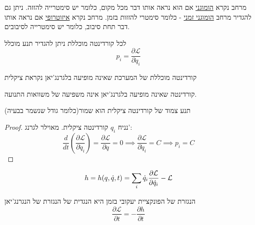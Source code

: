 \documentclass{tstextbook}
\begin{document}
\begin{definition}
מרחב נקרא \underline{הומוגני} אם הוא נראה אותו דבר מכל מקום, כלומר יש סימטרייה להזזה. ניתן גם להגדיר מרחב \underline{הומוגני זמני} - כלומר סימטרי להזזות בזמן.
מרחב נקרא \underline{איזוטרופי} אם נראה אותו דבר תחת סיבוב, כלומר יש סימטרייה לסיבובים.

\end{definition}
\begin{definition}
לכל קורדינטה מוכללת ניתן להגדיר תנע מוכלל $$p_{i}={\frac{\partial \mathcal{L}}{\partial{\dot{q}}_{i}}}$$

קורדינטה מוכללת של המערכת שאינה מופיעה בלגרנג'יאן נקראת ציקלית

\end{definition}
\begin{remark}
קורדינטה שאינה מופיעה בלגרנג'יאן אינה משפיעה של משוואות התנועה.

\end{remark}
\begin{theorem}
תנע צמוד של קורדינטה ציקלית הוא שמור(כלומר גודל שנשמר בבעיה)

\end{theorem}
\begin{proof}
נניח \(q_{i}\) קורדינטה ציקלית. מאוילר לגרנג':
$$\frac{d}{dt}\left( \frac{\partial \mathcal{L}  }{\partial \dot{q}_{i}} \right)=\frac{\partial \mathcal{L}  }{\partial q}=0\implies \frac{\partial \mathcal{L}  }{\partial \dot{q}_{i}}=C\implies p_{i}=C$$

\end{proof}
\begin{definition}
$$h=h(q,\dot{q},t)=\sum_{i}\dot{q}_{i}\frac{\partial{\cal L}}{\partial\dot{q}_{i}}-{\cal L}$$

\end{definition}
\begin{theorem}
הנגזרת של הפונקציית יעקובי בזמן היא הנגדית של הנגזרת של הנגרנג'יאן
$$\frac{\partial \mathcal{L} }{\partial t}=-\frac{\partial h}{\partial t}$$

\end{theorem}
\end{document}
